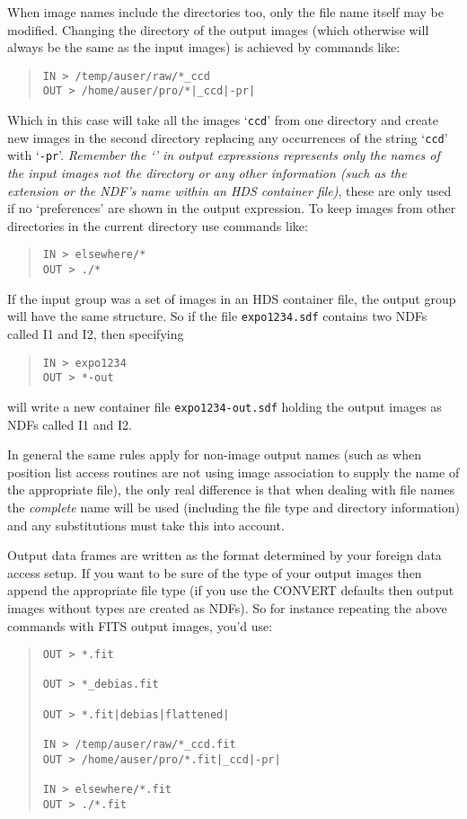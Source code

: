 \documentclass[twoside,11pt]{article}
\newcommand{\latexhtml}[2]{#1}
\renewcommand{\_}{\texttt{\symbol{95}}}
\newcommand{\ttsize}{\latexhtml{\small}{}}
\newenvironment{myquote}{\begin{quote}\ttsize}{\end{quote}}
\newcommand{\text}[1]{{\ttsize \tt #1}}
\begin{document}
When image names include the directories too, only the file name itself may
be modified. Changing the directory of the output images (which otherwise
will always be the same as the input images) is achieved by commands
like:
\begin{myquote}
\begin{verbatim}
IN > /temp/auser/raw/*_ccd
OUT > /home/auser/pro/*|_ccd|-pr|
\end{verbatim}
\end{myquote}
Which in this case will take all the images `\text{*\_ccd}' from one
directory and create new images in the second directory replacing any
occurrences of the string
`\text{\_ccd}' with `\text{-pr}'. {\em Remember the
`\text{*}' in output expressions represents only the names of
the input images not the directory or any other information (such as
the extension or the NDF's name within an HDS container file)}, 
these are only used if no `preferences' are shown
in the output expression. To keep images from other directories
in the current directory use commands like:
\begin{myquote}
\begin{verbatim}
IN > elsewhere/*
OUT > ./*
\end{verbatim}
\end{myquote}

If the input group was a set of images in an HDS container file,
the output group will have the same structure.
So if the file \text{expo1234.sdf} 
contains two NDFs called I1 and I2, then specifying
\begin{myquote}
\begin{verbatim}
IN > expo1234
OUT > *-out
\end{verbatim}
\end{myquote}
will write a new container file \text{expo1234-out.sdf}
holding the output images as NDFs called I1 and I2.

In general the same rules apply for non-image output names (such as
when position list access routines are not using image association to
supply the name of the appropriate file), the only real difference is
that when dealing with file names the {\em complete} name will be used
(including the file type and directory information) and any
substitutions must take this into account.

Output data frames are written as the format determined by your
foreign data access setup. If you want to be sure of the type of your
output images then append the appropriate file type (if you use the
CONVERT defaults then output images without types are created as
NDFs). So for instance repeating the above commands with FITS output
images, you'd use:
\begin{myquote}
\begin{verbatim}
OUT > *.fit

OUT > *_debias.fit

OUT > *.fit|debias|flattened|

IN > /temp/auser/raw/*_ccd.fit
OUT > /home/auser/pro/*.fit|_ccd|-pr|

IN > elsewhere/*.fit
OUT > ./*.fit
\end{verbatim}
\end{myquote}
\end{document}
